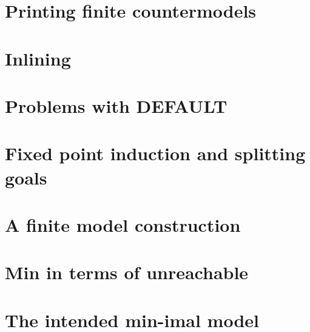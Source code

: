 \documentclass[preprint,nocopyrightspace]{sigplanconf}
\begin{document}
\section{Printing finite countermodels}
  

\section{Inlining}
  

\section{Problems with DEFAULT}
  

\section{Fixed point induction and splitting goals}
  

\section{A finite model construction}\label{sect:finite-model-proof}


\section{Min in terms of unreachable}


\section{The intended min-imal model}

\end{document}
